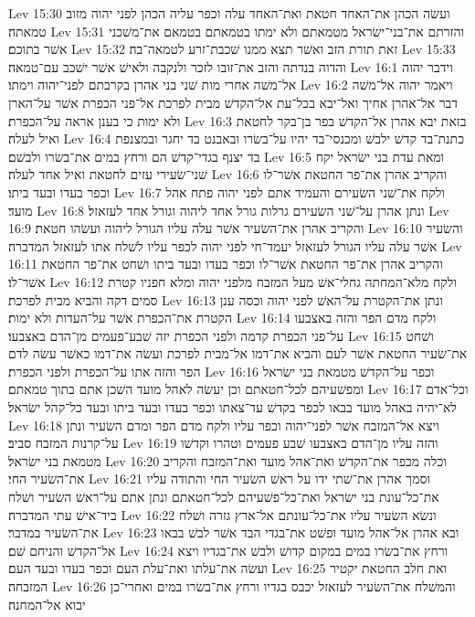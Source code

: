 Lev 15:30  ועשׂה הכהן את־האחד חטאת ואת־האחד עלה וכפר עליה הכהן לפני יהוה מזוב טמאתה׃
Lev 15:31  והזרתם את־בני־ישׂראל מטמאתם ולא ימתו בטמאתם בטמאם את־משׁכני אשׁר בתוכם׃
Lev 15:32  זאת תורת הזב ואשׁר תצא ממנו שׁכבת־זרע לטמאה־בה׃
Lev 15:33  והדוה בנדתה והזב את־זובו לזכר ולנקבה ולאישׁ אשׁר ישׁכב עם־טמאה׃
Lev 16:1  וידבר יהוה אל־משׁה אחרי מות שׁני בני אהרן בקרבתם לפני־יהוה וימתו׃
Lev 16:2  ויאמר יהוה אל־משׁה דבר אל־אהרן אחיך ואל־יבא בכל־עת אל־הקדשׁ מבית לפרכת אל־פני הכפרת אשׁר על־הארן ולא ימות כי בענן אראה על־הכפרת׃
Lev 16:3  בזאת יבא אהרן אל־הקדשׁ בפר בן־בקר לחטאת ואיל לעלה׃
Lev 16:4  כתנת־בד קדשׁ ילבשׁ ומכנסי־בד יהיו על־בשׂרו ובאבנט בד יחגר ובמצנפת בד יצנף בגדי־קדשׁ הם ורחץ במים את־בשׂרו ולבשׁם׃
Lev 16:5  ומאת עדת בני ישׂראל יקח שׁני־שׂעירי עזים לחטאת ואיל אחד לעלה׃
Lev 16:6  והקריב אהרן את־פר החטאת אשׁר־לו וכפר בעדו ובעד ביתו׃
Lev 16:7  ולקח את־שׁני השׂעירם והעמיד אתם לפני יהוה פתח אהל מועד׃
Lev 16:8  ונתן אהרן על־שׁני השׂעירם גרלות גורל אחד ליהוה וגורל אחד לעזאזל׃
Lev 16:9  והקריב אהרן את־השׂעיר אשׁר עלה עליו הגורל ליהוה ועשׂהו חטאת׃
Lev 16:10  והשׂעיר אשׁר עלה עליו הגורל לעזאזל יעמד־חי לפני יהוה לכפר עליו לשׁלח אתו לעזאזל המדברה׃
Lev 16:11  והקריב אהרן את־פר החטאת אשׁר־לו וכפר בעדו ובעד ביתו ושׁחט את־פר החטאת אשׁר־לו׃
Lev 16:12  ולקח מלא־המחתה גחלי־אשׁ מעל המזבח מלפני יהוה ומלא חפניו קטרת סמים דקה והביא מבית לפרכת׃
Lev 16:13  ונתן את־הקטרת על־האשׁ לפני יהוה וכסה ענן הקטרת את־הכפרת אשׁר על־העדות ולא ימות׃
Lev 16:14  ולקח מדם הפר והזה באצבעו על־פני הכפרת קדמה ולפני הכפרת יזה שׁבע־פעמים מן־הדם באצבעו׃
Lev 16:15  ושׁחט את־שׂעיר החטאת אשׁר לעם והביא את־דמו אל־מבית לפרכת ועשׂה את־דמו כאשׁר עשׂה לדם הפר והזה אתו על־הכפרת ולפני הכפרת׃
Lev 16:16  וכפר על־הקדשׁ מטמאת בני ישׂראל ומפשׁעיהם לכל־חטאתם וכן יעשׂה לאהל מועד השׁכן אתם בתוך טמאתם׃
Lev 16:17  וכל־אדם לא־יהיה באהל מועד בבאו לכפר בקדשׁ עד־צאתו וכפר בעדו ובעד ביתו ובעד כל־קהל ישׂראל׃
Lev 16:18  ויצא אל־המזבח אשׁר לפני־יהוה וכפר עליו ולקח מדם הפר ומדם השׂעיר ונתן על־קרנות המזבח סביב׃
Lev 16:19  והזה עליו מן־הדם באצבעו שׁבע פעמים וטהרו וקדשׁו מטמאת בני ישׂראל׃
Lev 16:20  וכלה מכפר את־הקדשׁ ואת־אהל מועד ואת־המזבח והקריב את־השׂעיר החי׃
Lev 16:21  וסמך אהרן את־שׁתי ידו על ראשׁ השׂעיר החי והתודה עליו את־כל־עונת בני ישׂראל ואת־כל־פשׁעיהם לכל־חטאתם ונתן אתם על־ראשׁ השׂעיר ושׁלח ביד־אישׁ עתי המדברה׃
Lev 16:22  ונשׂא השׂעיר עליו את־כל־עונתם אל־ארץ גזרה ושׁלח את־השׂעיר במדבר׃
Lev 16:23  ובא אהרן אל־אהל מועד ופשׁט את־בגדי הבד אשׁר לבשׁ בבאו אל־הקדשׁ והניחם שׁם׃
Lev 16:24  ורחץ את־בשׂרו במים במקום קדושׁ ולבשׁ את־בגדיו ויצא ועשׂה את־עלתו ואת־עלת העם וכפר בעדו ובעד העם׃
Lev 16:25  ואת חלב החטאת יקטיר המזבחה׃
Lev 16:26  והמשׁלח את־השׂעיר לעזאזל יכבס בגדיו ורחץ את־בשׂרו במים ואחרי־כן יבוא אל־המחנה׃
